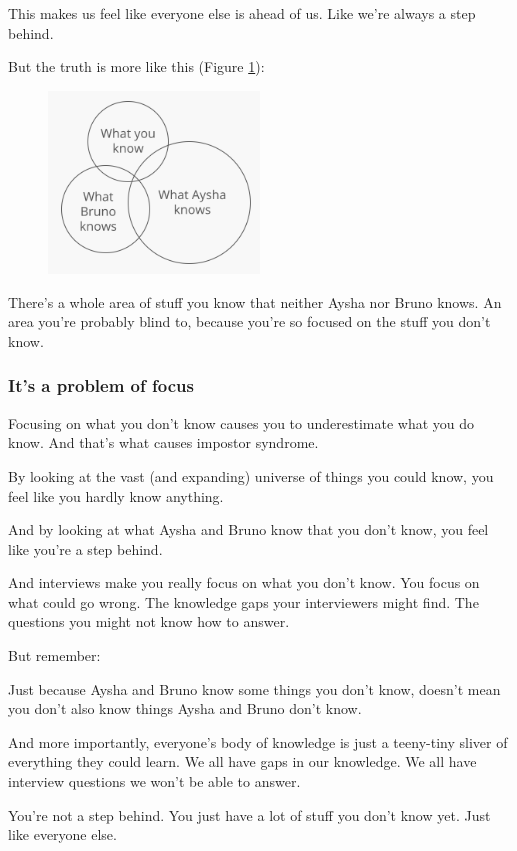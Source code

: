 \documentclass{article}
\begin{document}
This makes us feel like everyone else is ahead of us. Like we're always a step behind.

But the truth is more like this (Figure \ref{fig:true-what-everyone-else-know}):

\begin{figure}[!ht]
  \centering
  \includegraphics[width=0.5\textwidth]{pics/true-what-everyone-else-know}
  \label{fig:true-what-everyone-else-know}
\end{figure}


There's a whole area of stuff you know that neither Aysha nor Bruno knows. An area you're probably blind to, because you're so focused on the stuff you don't know.


\subsubsection{It's a problem of focus}

Focusing on what you don't know causes you to underestimate what you do know. And that's what causes impostor syndrome.

By looking at the vast (and expanding) universe of things you could know, you feel like you hardly know anything.

And by looking at what Aysha and Bruno know that you don't know, you feel like you're a step behind.

And interviews make you really focus on what you don't know. You focus on what could go wrong. The knowledge gaps your interviewers might find. The questions you might not know how to answer.

But remember:

Just because Aysha and Bruno know some things you don't know, doesn't mean you don't also know things Aysha and Bruno don't know.

And more importantly, everyone's body of knowledge is just a teeny-tiny sliver of everything they could learn. We all have gaps in our knowledge. We all have interview questions we won't be able to answer.

You're not a step behind. You just have a lot of stuff you don't know yet. Just like everyone else.
\end{document}
